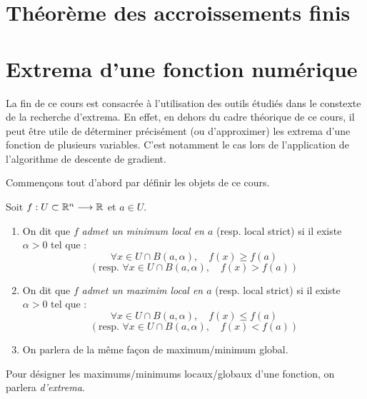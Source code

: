 
\section{Théorème des accroissements finis}



\section{Extrema d'une fonction numérique}

La fin de ce cours est consacrée à l'utilisation des outils étudiés dans le constexte de 
la recherche d'extrema. 
En effet, en dehors du cadre théorique de ce cours, il peut être utile de déterminer précisément (ou d'approximer)
les extrema d'une fonction de plusieurs variables. C'est notamment le cas lors de l'application 
de l'algorithme de descente de gradient. 

Commençons tout d'abord par définir les objets de ce cours. 

\begin{definition}[Extrema]
    Soit $f : U \subset \mathbb{R}^n \longrightarrow \mathbb{R}$ et $a \in U$. 
    \begin{enumerate}
        \item On dit que $f$ \emph{admet un minimum local en $a$} (resp. local strict) si 
        il existe $\alpha > 0$ tel que : 
            \[ \forall x \in U \cap B(a, \alpha), \quad f(x) \geqslant f(a) \] 
            \[ (\text{resp. } \forall x \in U \cap B(a, \alpha), \quad f(x) > f(a)) \] 
        \item On dit que $f$ \emph{admet un maximim local en $a$} (resp. local strict) si 
        il existe $\alpha > 0$ tel que : 
            \[ \forall x \in U \cap B(a, \alpha), \quad f(x) \leqslant f(a) \] 
            \[ (\text{resp. } \forall x \in U \cap B(a, \alpha), \quad f(x) < f(a)) \] 
        \item On parlera de la même façon de maximum/minimum global. 
    \end{enumerate}
    Pour désigner les maximums/minimums locaux/globaux d'une fonction, on parlera \emph{d'extrema}. 
\end{definition}

